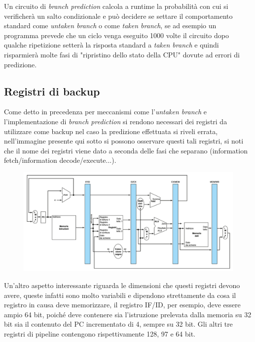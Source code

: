 \documentclass[class=book, crop=false, oneside]{standalone}
\begin{document}
Un circuito di \emph{branch prediction} calcola a runtime la probabilità con cui si verificherà un salto condizionale e può decidere se settare il comportamento standard come \emph{untaken branch} o come \emph{taken branch}, se ad esempio un programma prevede che un ciclo venga eseguito 1000 volte il circuito dopo qualche ripetizione setterà la risposta standard a \emph{taken branch} e quindi risparmierà molte fasi di "ripristino dello stato della CPU" dovute ad errori di predizione.

\subsection{Registri di backup}
Come detto in precedenza per meccanismi come l'\emph{untaken branch} e l'implementazione di \emph{branch prediction} si rendono necessari dei registri da utilizzare come backup nel caso la predizione effettuata si riveli errata, nell'immagine presente qui sotto si possono osservare questi tali registri, si noti che il nome dei registri viene dato a seconda delle fasi che separano (information fetch/information decode/execute...).
\begin{figure}[H]
	\centering
	\includegraphics[width=\textwidth,keepaspectratio]{registri-di-backup.png}
\end{figure}
Un'altro aspetto interessante riguarda le dimensioni che questi registri devono avere, queste infatti sono molto variabili e dipendono strettamente da cosa il registro in causa deve memorizzare, il registro IF/ID, per esempio, deve essere ampio 64 bit, poiché deve contenere sia l’istruzione prelevata dalla memoria su 32 bit sia il contenuto del PC incrementato di 4, sempre su 32 bit. Gli altri tre registri di pipeline contengono rispettivamente 128, 97 e 64 bit.
\end{document}
